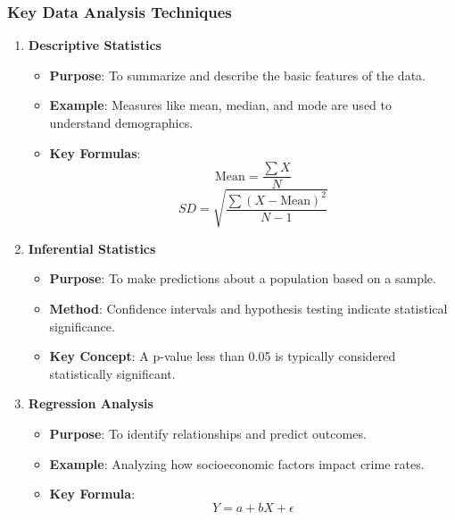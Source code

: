 \documentclass[aspectratio=169]{beamer}
\begin{document}
\begin{frame}[fragile]
    \frametitle{Key Data Analysis Techniques}
    \begin{enumerate}
        \item \textbf{Descriptive Statistics}
            \begin{itemize}
                \item \textbf{Purpose}: To summarize and describe the basic features of the data.
                \item \textbf{Example}: Measures like mean, median, and mode are used to understand demographics.
                \item \textbf{Key Formulas}:
                    \begin{equation}
                    \text{Mean} = \frac{\sum{X}}{N}
                    \end{equation}
                    \begin{equation}
                    SD = \sqrt{\frac{\sum{(X - \text{Mean})^2}}{N-1}}
                    \end{equation}
            \end{itemize}
        
        \item \textbf{Inferential Statistics}
            \begin{itemize}
                \item \textbf{Purpose}: To make predictions about a population based on a sample.
                \item \textbf{Method}: Confidence intervals and hypothesis testing indicate statistical significance.
                \item \textbf{Key Concept}: A p-value less than 0.05 is typically considered statistically significant.
            \end{itemize}
        
        \item \textbf{Regression Analysis}
            \begin{itemize}
                \item \textbf{Purpose}: To identify relationships and predict outcomes.
                \item \textbf{Example}: Analyzing how socioeconomic factors impact crime rates.
                \item \textbf{Key Formula}:
                    \begin{equation}
                    Y = a + bX + \epsilon
                    \end{equation}
            \end{itemize}
    \end{enumerate}
\end{frame}
\end{document}
